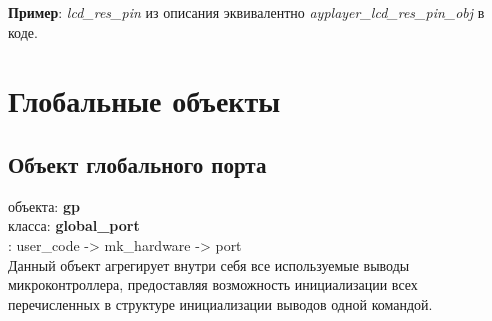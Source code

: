 \documentclass[a4paper, 12pt]{article}
\begin{document}
\textbf{Пример}: \textit{lcd\_res\_pin} из описания эквивалентно \textit{ayplayer\_lcd\_res\_pin\_obj} в коде.


\section{Глобальные объекты}

\subsection{Объект глобального порта}
\label{gb}
 объекта: \textbf{gp}\\
 класса: \textbf{global\_port}\\
: user\_code -> mk\_hardware -> port\\

Данный объект агрегирует внутри себя все используемые выводы микроконтроллера, предоставляя возможность инициализации всех перечисленных в структуре инициализации выводов одной командой.
\end{document}
